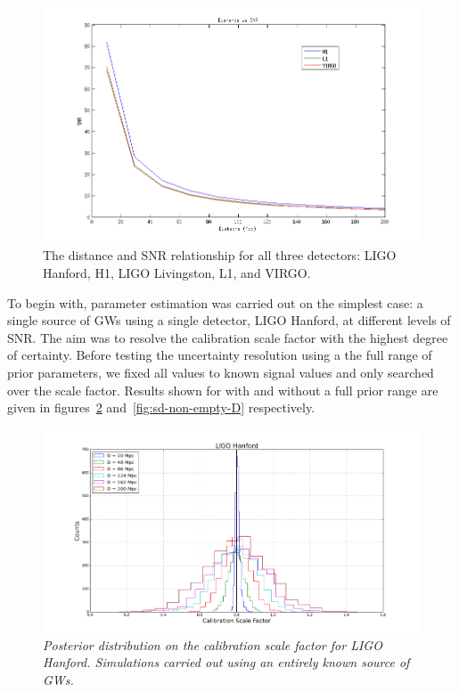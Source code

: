\documentclass[12pt]{iopart}
\begin{document}
\begin{figure}
  \centering
  \includegraphics[width = \textwidth]{DvsSNR-mult-det}
  \caption{The distance and SNR relationship for all three detectors:
LIGO Hanford, H1, LIGO Livingston, L1, and VIRGO.}
  \label{fig:distsnr}
\end{figure}

To begin with, parameter estimation was carried out on the simplest case: a
single source of GWs using a single detector, LIGO Hanford, at different levels
of SNR. The aim was to resolve the calibration scale factor with the highest
degree of certainty.  Before testing the uncertainty resolution using a the
full range of prior parameters, we fixed all values to known signal values and
only searched over the scale factor. Results shown for with and without a full
prior range are given in figures~\ref{fig:sd-empty-D}
and~\ref{fig:sd-non-empty-D} respectively.


\begin{figure}
  \centering
  \includegraphics[width = \textwidth]{SD_empty_D10_200}
  \caption{\textit{Posterior distribution on the calibration scale factor for
LIGO Hanford. Simulations carried out using an entirely known source of GWs.}}
  \label{fig:sd-empty-D}
\end{figure}
\end{document}
